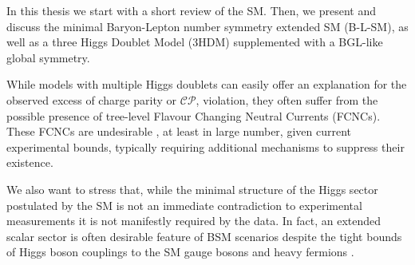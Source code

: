 
In this thesis we start with a short review of the SM. Then, we present and discuss the minimal Baryon-Lepton number symmetry extended SM (B-L-SM), as well as a three Higgs Doublet Model (3HDM) supplemented with a BGL-like global symmetry. 

%
%
%

While models with multiple Higgs doublets can easily offer an explanation for the observed excess of charge parity or $\mathcal{CP}$, violation, they often suffer from the possible presence of tree-level Flavour Changing Neutral Currents (FCNCs). 
%
These FCNCs are undesirable \cite{ILYUSHIN2020114921}, at least in large number, given current experimental bounds, typically requiring additional mechanisms to suppress their existence. 



We also want to stress that, while the minimal structure of the Higgs sector postulated by the SM is not an immediate contradiction to experimental measurements it is not manifestly required by the data. 
%
In fact, an extended scalar sector is often desirable feature of BSM scenarios despite the tight bounds of Higgs boson couplings to the SM gauge bosons and heavy fermions \cite{10.1093/ptep/ptaa104}. 

